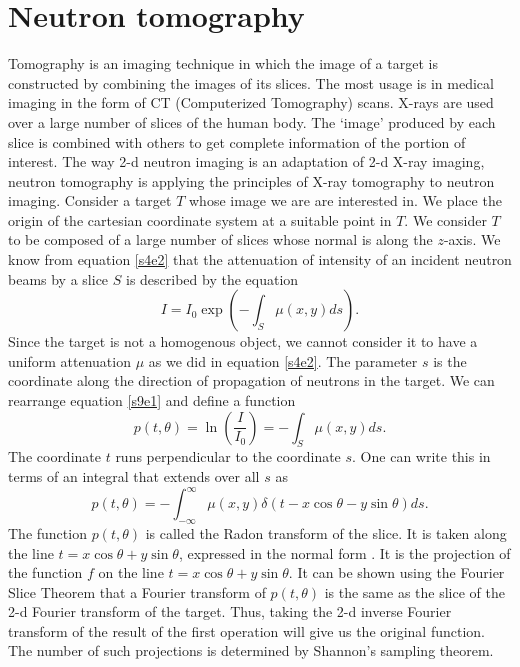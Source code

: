 \documentclass{article}
\numberwithin{equation}{section}
\begin{document}
\section{Neutron tomography}\label{s9}
Tomography is an imaging technique in which the image of a target is constructed
by combining the images of its slices. The most usage is in medical imaging
in the form of CT (Computerized Tomography) scans. X-rays are used over a 
large number of slices of the human body. The `image' produced by each slice
is combined with others to get complete information of the portion of interest.
The way 2-d neutron imaging is an adaptation of 2-d X-ray imaging, neutron
tomography is applying the principles of X-ray tomography to neutron imaging. 
Consider a target $T$ whose image we are are interested in. We place the origin
of the cartesian coordinate system at a suitable point in $T$. We consider $T$
to be composed of a large number of slices whose normal is along the $z$-axis.
We know from equation \eqref{s4e2} that the attenuation of intensity of an
incident neutron beams by a slice $S$ is described by the equation
\begin{equation}\label{s9e1}
I = I_0\exp\left(-\int_S\mu(x, y)ds\right).
\end{equation}
Since the target is not a homogenous object, we cannot consider it to have a
uniform attenuation $\mu$ as we did in equation \eqref{s4e2}. The parameter
$s$ is the coordinate along the direction of propagation of neutrons in the
target. We can rearrange equation \eqref{s9e1} and define a function
\begin{equation}\label{s9e2}
p(t, \theta) = \ln\left(\frac{I}{I_0}\right) = -\int_S\mu(x, y)ds.
\end{equation}
The coordinate $t$ runs perpendicular to the coordinate $s$. One can write 
this in terms of an integral that extends over all $s$ as
\begin{equation}\label{s9e3}
p(t, \theta) = 
-\int_{-\infty}^\infty \mu(x, y)\delta(t - x\cos\theta - y\sin\theta)ds.
\end{equation}
The function $p(t, \theta)$ is called the Radon transform of the slice. It is
taken along the line $t = x\cos\theta + y\sin\theta$, expressed in the 
normal form \cite{gonzales1992digital}. It is the projection of the function
$f$ on the line $t = x\cos\theta + y\sin\theta$. It can be shown using the
Fourier Slice Theorem \cite{bracewell1956strip} that a Fourier transform of
$p(t, \theta)$ is the same as the slice of the 2-d Fourier transform of the
target. Thus, taking the 2-d inverse Fourier transform of the result of the
first operation will give us the original function. The number of such
projections is determined by Shannon's sampling theorem. 
\end{document}
